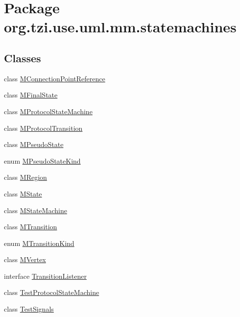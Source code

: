 \hypertarget{namespaceorg_1_1tzi_1_1use_1_1uml_1_1mm_1_1statemachines}{\section{Package org.\-tzi.\-use.\-uml.\-mm.\-statemachines}
\label{namespaceorg_1_1tzi_1_1use_1_1uml_1_1mm_1_1statemachines}
}
\subsection*{Classes}
\begin{DoxyCompactItemize}
\item 
class \hyperlink{classorg_1_1tzi_1_1use_1_1uml_1_1mm_1_1statemachines_1_1_m_connection_point_reference}{M\-Connection\-Point\-Reference}
\item 
class \hyperlink{classorg_1_1tzi_1_1use_1_1uml_1_1mm_1_1statemachines_1_1_m_final_state}{M\-Final\-State}
\item 
class \hyperlink{classorg_1_1tzi_1_1use_1_1uml_1_1mm_1_1statemachines_1_1_m_protocol_state_machine}{M\-Protocol\-State\-Machine}
\item 
class \hyperlink{classorg_1_1tzi_1_1use_1_1uml_1_1mm_1_1statemachines_1_1_m_protocol_transition}{M\-Protocol\-Transition}
\item 
class \hyperlink{classorg_1_1tzi_1_1use_1_1uml_1_1mm_1_1statemachines_1_1_m_pseudo_state}{M\-Pseudo\-State}
\item 
enum \hyperlink{enumorg_1_1tzi_1_1use_1_1uml_1_1mm_1_1statemachines_1_1_m_pseudo_state_kind}{M\-Pseudo\-State\-Kind}
\item 
class \hyperlink{classorg_1_1tzi_1_1use_1_1uml_1_1mm_1_1statemachines_1_1_m_region}{M\-Region}
\item 
class \hyperlink{classorg_1_1tzi_1_1use_1_1uml_1_1mm_1_1statemachines_1_1_m_state}{M\-State}
\item 
class \hyperlink{classorg_1_1tzi_1_1use_1_1uml_1_1mm_1_1statemachines_1_1_m_state_machine}{M\-State\-Machine}
\item 
class \hyperlink{classorg_1_1tzi_1_1use_1_1uml_1_1mm_1_1statemachines_1_1_m_transition}{M\-Transition}
\item 
enum \hyperlink{enumorg_1_1tzi_1_1use_1_1uml_1_1mm_1_1statemachines_1_1_m_transition_kind}{M\-Transition\-Kind}
\item 
class \hyperlink{classorg_1_1tzi_1_1use_1_1uml_1_1mm_1_1statemachines_1_1_m_vertex}{M\-Vertex}
\item 
interface \hyperlink{interfaceorg_1_1tzi_1_1use_1_1uml_1_1mm_1_1statemachines_1_1_transition_listener}{Transition\-Listener}
\item 
class \hyperlink{classorg_1_1tzi_1_1use_1_1uml_1_1mm_1_1statemachines_1_1_test_protocol_state_machine}{Test\-Protocol\-State\-Machine}
\item 
class \hyperlink{classorg_1_1tzi_1_1use_1_1uml_1_1mm_1_1statemachines_1_1_test_signals}{Test\-Signals}
\end{DoxyCompactItemize}
